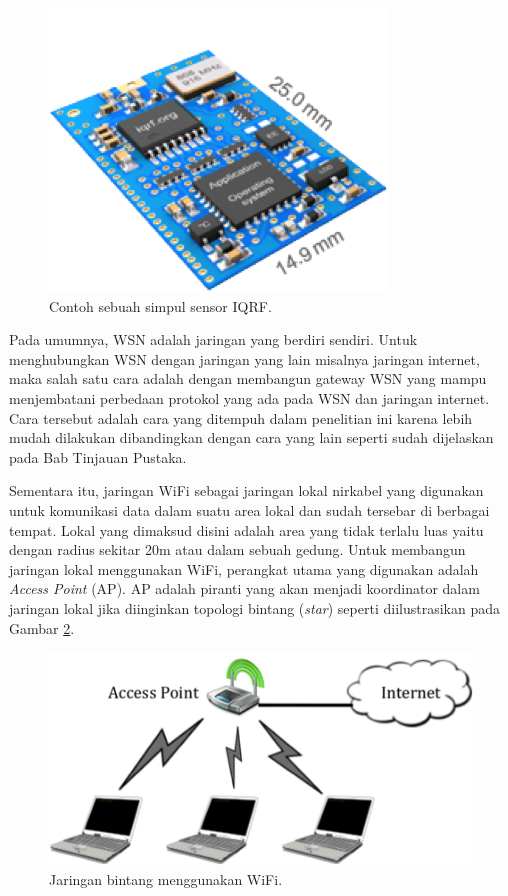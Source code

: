       \begin{figure}[H]
        \centering
          \includegraphics{gambar/iqrf}
          \caption{Contoh sebuah simpul sensor IQRF.}
          \label{iqrf}
      \end{figure}

    Pada umumnya, WSN adalah jaringan yang berdiri sendiri. Untuk menghubungkan WSN dengan jaringan yang lain misalnya jaringan internet, maka salah satu cara adalah dengan membangun gateway WSN yang mampu menjembatani perbedaan protokol yang ada pada WSN dan jaringan internet. Cara tersebut adalah cara yang ditempuh dalam penelitian ini karena lebih mudah dilakukan dibandingkan dengan cara yang lain seperti sudah dijelaskan pada Bab Tinjauan Pustaka.

    Sementara itu, jaringan WiFi sebagai jaringan lokal nirkabel yang digunakan untuk komunikasi data dalam suatu area lokal dan sudah tersebar di berbagai tempat. Lokal yang dimaksud disini adalah area yang tidak terlalu luas yaitu dengan radius sekitar 20m atau dalam sebuah gedung. Untuk membangun jaringan lokal menggunakan WiFi, perangkat utama yang digunakan adalah \emph{Access Point} (AP). AP adalah piranti yang akan menjadi koordinator dalam jaringan lokal jika diinginkan topologi bintang (\emph{star}) seperti diilustrasikan pada Gambar \ref{star}.

      \begin{figure}[ht!]
        \centering
          \includegraphics{gambar/star}
          \caption{Jaringan bintang menggunakan WiFi.}
          \label{star}
      \end{figure}

